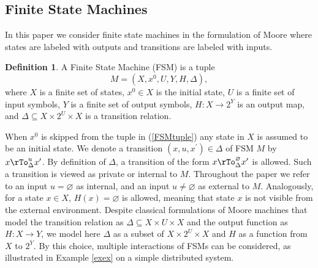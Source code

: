 \documentclass{amsart}
\theoremstyle{definition}
\newtheorem{definition}[theorem]{Definition}
\theoremstyle{remark}
\numberwithin{equation}{section}
\begin{document}
\subsection{Finite State Machines}
In this paper we consider finite state machines in the formulation of Moore \cite{Moore} where states are labeled with outputs and transitions are labeled with inputs.
\begin{definition} 
\cite{FSMmin} 
\label{DefFSM}
A Finite State Machine (FSM) is a tuple 
\begin{equation}
\label{FSMtuple}
M=(X,x^{0},U,Y,H,\Delta),
\end{equation}
where $X$ is a finite set of states, $x^{0}\in X$ is the initial state, $U$ is a finite set of input symbols, $Y$ is a finite set of output symbols,  $H:X \rightarrow 2^{Y}$ is an output map, and $\Delta \subseteq X\times 2^{U} \times X$ is a transition relation. 
\end{definition}
When $x^{0}$ is skipped from the tuple in (\ref{FSMtuple}) any state in $X$ is assumed to be an initial state. 
We denote a transition $(x,u,x^{\prime})\in\Delta$ of FSM $M$ by $x \rTo^{u}_{\Delta} x^{\prime}$.  
By definition of $\Delta$, a transition of the form $x \rTo^{\varnothing}_{\Delta} x^{\prime}$ is allowed. Such a transition is viewed as private or internal to $M$. Throughout the paper we refer to an input $u=\varnothing$ as internal, and an input $u\neq\varnothing$ as external to $M$. 
Analogously, for a state $x\in X$, $H(x)=\varnothing$ is allowed, meaning that state $x$ is not visible from the external environment. 
Despite classical formulations of Moore machines that model the transition relation as $\Delta\subseteq X\times U \times X$ and the output function as $H:X \rightarrow Y$, we model here $\Delta$ as a subset of $X\times 2^{U} \times X$ and $H$ as a function from $X$ to $2^{Y}$. By this choice, multiple interactions of FSMs can be considered, as illustrated in Example \ref{exex} on a simple distributed system. 
\end{document}
